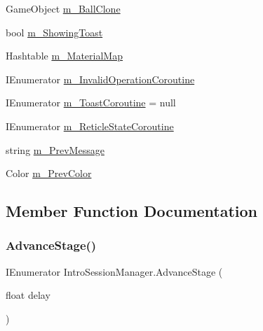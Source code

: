 \begin{DoxyCompactItemize}
\item 
Game\+Object \mbox{\hyperlink{class_intro_session_manager_aba1a41efd4328b389c8dd6a301b20a4a}{m\+\_\+\+Ball\+Clone}}
\item 
bool \mbox{\hyperlink{class_intro_session_manager_ade25d99d3058a14d4c2738a51281780e}{m\+\_\+\+Showing\+Toast}}
\item 
Hashtable \mbox{\hyperlink{class_intro_session_manager_ad719cd26d73b589cc92fdb3b4ad9a996}{m\+\_\+\+Material\+Map}}
\item 
I\+Enumerator \mbox{\hyperlink{class_intro_session_manager_ac3a4cf5ad448811271447cf9fa4b6d2b}{m\+\_\+\+Invalid\+Operation\+Coroutine}}
\item 
I\+Enumerator \mbox{\hyperlink{class_intro_session_manager_a709ed8345dde73d0a36c3c59e03f18f5}{m\+\_\+\+Toast\+Coroutine}} = null
\item 
I\+Enumerator \mbox{\hyperlink{class_intro_session_manager_acedcbccfb11e49f5279cbc11e7832c67}{m\+\_\+\+Reticle\+State\+Coroutine}}
\item 
string \mbox{\hyperlink{class_intro_session_manager_ab430fe3c2e7472725e639ba1dbe22822}{m\+\_\+\+Prev\+Message}}
\item 
Color \mbox{\hyperlink{class_intro_session_manager_a439437ada3c600dbffb75b971aafc45a}{m\+\_\+\+Prev\+Color}}
\end{DoxyCompactItemize}


\subsection{Member Function Documentation}
\mbox{\label{class_intro_session_manager_a93c526ae0e6c546c2ee76a6d150b4781}} 
\subsubsection{\texorpdfstring{Advance\+Stage()}{AdvanceStage()}}
{\footnotesize\ttfamily I\+Enumerator Intro\+Session\+Manager.\+Advance\+Stage (\begin{DoxyParamCaption}\item[{float}]{delay }\end{DoxyParamCaption})\hspace{0.3cm}{\ttfamily [private]}}



